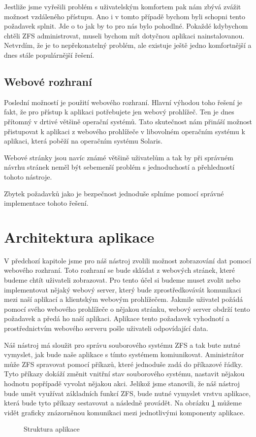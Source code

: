     Jestliže jsme vyřešili problém s uživatelským komfortem pak nám zbývá zvážit možnost vzdáleného přístupu. Ano i v tomto případě bychom byli schopni tento požadavek splnit. Jde o to jak by to pro nás bylo pohodlné. Pokaždé kdybychom chtěli ZFS administrovat, museli bychom mít dotyčnou aplikaci nainstalovanou. Netvrdím, že je to nepřekonatelný problém, ale existuje ještě jedno komfortnější a dnes stále populárnější řešení.
    \subsection{Webové rozhraní}
    Poslední možností je použití webového rozhraní. Hlavní výhodou toho řešení je fakt, že pro přístup k aplikaci potřebujete jen webový prohlížeč. Ten je dnes přítomný v drtivé většině operační systémů. Tato skutečnost nám přináší možnost přistupovat k aplikaci z webového prohlížeče v libovolném operačním systému k aplikaci, která poběží na operačním systému Solaris.

    Webové stránky jsou navíc známé většině uživatelům a tak by při správném návrhu stránek neměl být sebemenší problém s jednoduchostí a přehledností tohoto nástroje.

    Zbytek požadavků jako je bezpečnost jednoduše splníme pomocí správné implementace tohoto řešení.
\section{Architektura aplikace}
V předchozí kapitole jsme pro náš nástroj zvolili možnost zobrazování dat pomocí webového rozhraní. Toto rozhraní se bude skládat z webových stránek, které budeme chtít uživateli zobrazovat. Pro tento účel si budeme muset zvolit nebo implementovat nějaký webový server, který bude zprostředkovávát komunikaci mezi naší aplikací a klientským webovým prohlížečem. Jakmile uživatel požádá pomocí svého webového prohlížeče o nějakou stránku, webový server obdrží tento požadavek a předá ho naší aplikaci. Aplikace tento požadavek vyhodnotí a prostřednictvím webového serveru pošle uživateli odpovídající data.

Náš nástroj má sloužit pro správu souborového systému ZFS a tak bute nutné vymyslet, jak bude naše aplikace s tímto systémem komiunikovat. Aministrátor může ZFS spravovat pomocí příkazů, které jednoduše zadá do příkazové řádky. Tyto příkazy dokáží změnit vnitřní stav souborového systému, nastavit nějakou hodnotu popřípadě vyvolat nějakou akci. Jelikož jsme stanovili, že náš nástroj bude umět využívat základních funkcí ZFS, bude nutné vymyslet vrstvu aplikace, která bude tyto příkazy sestavovat a následně provádět. Na obrázku \ref{architecture} můžeme vidět graficky znázorněnou komunikaci mezi jednotlivými komponenty aplikace.
\begin{figure}[h]
        \caption{Struktura aplikace}
        \label{architecture}
\end{figure}
